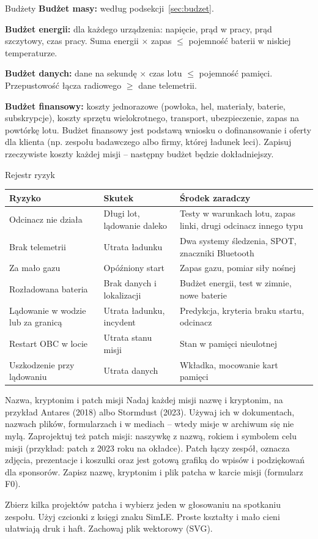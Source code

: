 \begin{sekcja}{Budżety}
\textbf{Budżet masy:} według podsekcji~\ref{sec:budzet}.

\textbf{Budżet energii:} dla każdego urządzenia: napięcie, prąd w pracy, prąd szczytowy, czas pracy. Suma energii $\times$ zapas $\leq$ pojemność baterii w niskiej temperaturze.

\textbf{Budżet danych:} dane na sekundę $\times$ czas lotu $\leq$ pojemność pamięci. Przepustowość łącza radiowego $\geq$ dane telemetrii.

\textbf{Budżet finansowy:} koszty jednorazowe (powłoka, hel, materiały, baterie, subskrypcje), koszty sprzętu wielokrotnego, transport, ubezpieczenie, zapas na powtórkę lotu. Budżet finansowy jest podstawą wniosku o dofinansowanie i oferty dla klienta (np. zespołu badawczego albo firmy, której ładunek leci). Zapisuj rzeczywiste koszty każdej misji -- następny budżet będzie dokładniejszy.
\end{sekcja}

\begin{sekcja}{Rejestr ryzyk}
\renewcommand{\arraystretch}{1.3}
\small
\begin{tabularx}{\linewidth}{@{}P{40mm}P{40mm}L@{}}
\toprule
\textbf{Ryzyko} & \textbf{Skutek} & \textbf{Środek zaradczy}\\\midrule
Odcinacz nie działa & Długi lot, lądowanie daleko & Testy w warunkach lotu, zapas linki, drugi odcinacz innego typu\\
Brak telemetrii & Utrata ładunku & Dwa systemy śledzenia, SPOT, znaczniki Bluetooth\\
Za mało gazu & Opóźniony start & Zapas gazu, pomiar siły nośnej\\
Rozładowana bateria & Brak danych i lokalizacji & Budżet energii, test w zimnie, nowe baterie\\
Lądowanie w wodzie lub za granicą & Utrata ładunku, incydent & Predykcja, kryteria braku startu, odcinacz\\
Restart OBC w locie & Utrata stanu misji & Stan w pamięci nieulotnej\\
Uszkodzenie przy lądowaniu & Utrata danych & Wkładka, mocowanie kart pamięci\\
\bottomrule
\end{tabularx}
\normalsize
\end{sekcja}

\begin{sekcja}{Nazwa, kryptonim i patch misji}\label{sec:patch}
Nadaj każdej misji nazwę i kryptonim, na przykład Antares (2018) albo Stormdust (2023). Używaj ich w dokumentach, nazwach plików, formularzach i w mediach -- wtedy misje w archiwum się nie mylą. Zaprojektuj też patch misji: naszywkę z nazwą, rokiem i symbolem celu misji (przykład: patch z 2023 roku na okładce). Patch łączy zespół, oznacza zdjęcia, prezentacje i koszulki oraz jest gotową grafiką do wpisów i podziękowań dla sponsorów. Zapisz nazwę, kryptonim i plik patcha w karcie misji (formularz F0).

Zbierz kilka projektów patcha i wybierz jeden w głosowaniu na spotkaniu zespołu. Użyj czcionki z księgi znaku SimLE. Proste kształty i mało cieni ułatwiają druk i haft. Zachowaj plik wektorowy (SVG).
\end{sekcja}

